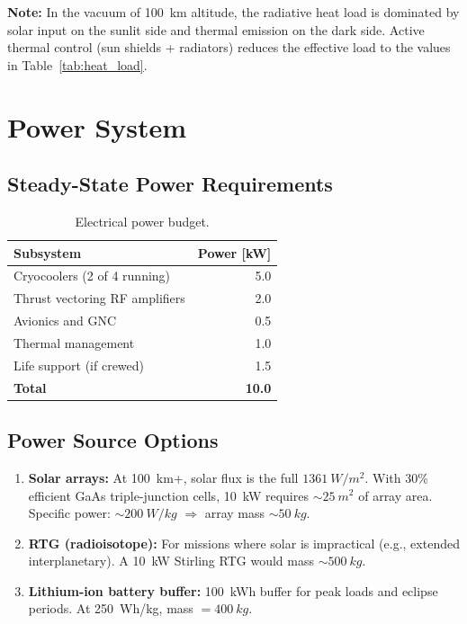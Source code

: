 \documentclass[11pt,a4paper]{article}
\begin{document}
\textbf{Note:} In the vacuum of \SI{100}{km} altitude, the radiative heat
load is dominated by solar input on the sunlit side and thermal emission
on the dark side. Active thermal control (sun shields + radiators) reduces
the effective load to the values in Table~\ref{tab:heat_load}.

\section{Power System}\label{sec:power}

\subsection{Steady-State Power Requirements}

\begin{table}[h]
\centering
\caption{Electrical power budget.}
\label{tab:power}
\begin{tabular}{@{}lr@{}}
\toprule
Subsystem & Power [\si{kW}] \\
\midrule
Cryocoolers (2 of 4 running) & 5.0 \\
Thrust vectoring RF amplifiers & 2.0 \\
Avionics and GNC & 0.5 \\
Thermal management & 1.0 \\
Life support (if crewed) & 1.5 \\
\midrule
\textbf{Total} & \textbf{10.0} \\
\bottomrule
\end{tabular}
\end{table}

\subsection{Power Source Options}

\begin{enumerate}[nosep]
\item \textbf{Solar arrays:} At \SI{100}{km}+, solar flux is the full
$\SI{1361}{W/m^2}$. With 30\% efficient GaAs triple-junction cells,
\SI{10}{kW} requires $\sim\!\SI{25}{m^2}$ of array area.
Specific power: $\sim\!\SI{200}{W/kg}$ $\Rightarrow$ array mass $\sim\!\SI{50}{kg}$.

\item \textbf{RTG (radioisotope):} For missions where solar is impractical
(e.g., extended interplanetary). A \SI{10}{kW} Stirling RTG would mass
$\sim\!\SI{500}{kg}$.

\item \textbf{Lithium-ion battery buffer:} \SI{100}{kWh} buffer for
peak loads and eclipse periods. At \SI{250}{Wh/kg}, mass $= \SI{400}{kg}$.
\end{enumerate}
\end{document}
